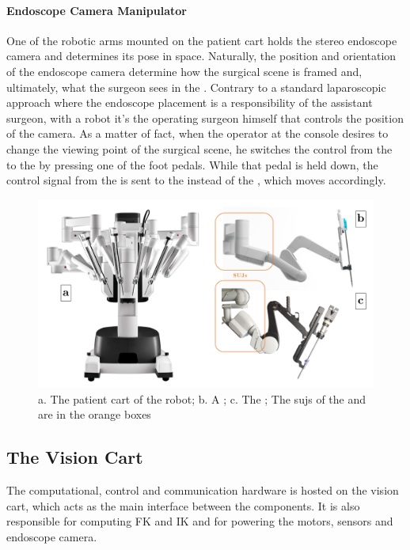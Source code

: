 \documentclass[../main.tex]{subfiles}
\begin{document}
\paragraph{Endoscope Camera Manipulator} One of the robotic arms mounted on the patient cart holds the stereo endoscope camera and determines its pose in space. Naturally, the position and orientation of the endoscope camera determine how the surgical scene is framed and, ultimately, what the surgeon sees in the \hrsv. Contrary to a standard laparoscopic approach where the endoscope placement is a responsibility of the assistant surgeon, with a \davinci robot it's the operating surgeon himself that controls the position of the camera. As a matter of fact, when the operator at the console desires to change the viewing point of the surgical scene, he switches the control from the \psms to the \ecm by pressing one of the foot pedals. While that pedal is held down, the control signal from the \mtms is sent to the \ecm instead of the \psms, which moves accordingly.

\begin{figure}
    \centering
    \includegraphics[width=\textwidth]{images/patient_cart_panel.png}
    \caption{a. The patient cart of the \davinci robot; b. A \psm; c. The \ecm; The \acp{suj} of the \psm and \ecm are in the orange boxes}
    \label{fig:patientcartpanel}
\end{figure}

\subsection{The Vision Cart} 
The computational, control and communication hardware is hosted on the vision cart, which acts as the main interface between the components. It is also responsible for computing FK and IK and for powering the motors, sensors and endoscope camera.
\end{document}
